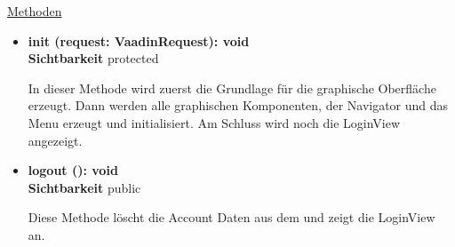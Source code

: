 \underline{Methoden}
\begin{itemize}
\itemsep0pt
\item \textbf{init (request: VaadinRequest): void}\hfill\\
\textbf{Sichtbarkeit} protected

In dieser Methode wird zuerst die Grundlage für die graphische Oberfläche erzeugt. Dann werden alle graphischen Komponenten, der Navigator und das Menu erzeugt und initialisiert. Am Schluss wird noch die LoginView angezeigt.

\item \textbf{logout (): void}\hfill\\
\textbf{Sichtbarkeit} public

Diese Methode löscht die Account Daten aus dem  und zeigt die LoginView an.

\end{itemize}